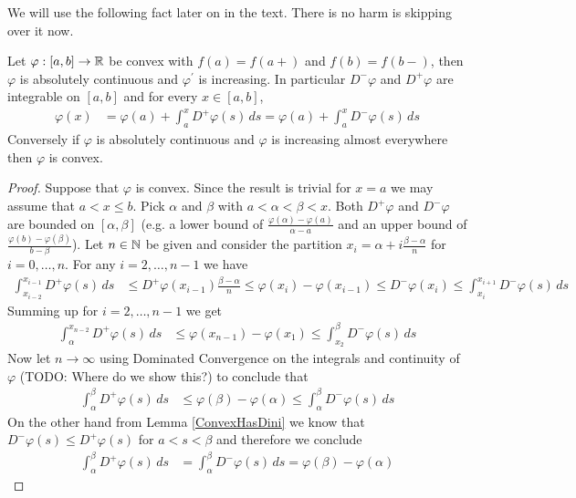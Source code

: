 We will use the following fact later on in the text.  There is no harm
is skipping over it now.
\begin{lem}\label{AbsoluteContinuityOfConvexFunctions}Let $\varphi : [a,b] \to \mathbb{R}$ be convex with $f(a) = f(a+)$ and $f(b) = f(b-)$, then $\varphi$ is absolutely continuous and $\varphi^\prime$ is increasing.  In particular $D^- \varphi$ and $D^+ \varphi$ are integrable on $[a,b]$ and
for every $x \in [a,b]$, 
\begin{align*}
\varphi(x) &= \varphi(a) + \int_a^x D^+\varphi(s) \, ds = \varphi(a) + \int_a^x D^-\varphi(s) \, ds 
\end{align*}
Conversely if $\varphi$ is absolutely continuous and $\varphi$ is increasing almost everywhere then $\varphi$ is convex.
\end{lem}
\begin{proof}
Suppose that $\varphi$ is convex.  Since the result is trivial for $x=a$ we may assume that $a < x \leq b$.  Pick $\alpha$ and $\beta$ with $a < \alpha < \beta < x$.  Both $D^+\varphi$ and $D^- \varphi$ are bounded on $[\alpha, \beta]$ (e.g. a lower bound of $\frac{\varphi(\alpha) - \varphi(a)}{\alpha - a}$ and an upper bound of $\frac{\varphi(b) - \varphi(\beta)}{b - \beta}$).  Let 
$n \in \mathbb{N}$ be given and consider the partition $x_i = \alpha + i \frac{\beta - \alpha}{n}$ for $i=0, \dotsc, n$.  For any $i=2, \dotsc, n-1$ we have
\begin{align*}
\int_{x_{i-2}}^{x_{i-1}} D^+\varphi(s) \, ds  &\leq D^+\varphi (x_{i-1}) \frac{\beta - \alpha}{n} \leq \varphi(x_i) - \varphi(x_{i-1}) \leq D^-\varphi (x_i) \leq \int_{x_{i}}^{x_{i+1}} D^-\varphi(s) \, ds
\end{align*}
Summing up for $i=2, \dotsc, n-1$ we get
\begin{align*}
\int_\alpha^{x_{n-2}} D^+\varphi(s) \, ds &\leq \varphi(x_{n-1}) - \varphi(x_{1}) \leq \int_{x_2}^{\beta} D^-\varphi(s) \, ds
\end{align*}
Now let $n \to \infty$ using Dominated Convergence on the integrals and continuity of $\varphi$ (TODO: Where do we show this?)  to conclude that 
\begin{align*}
\int_\alpha^{\beta} D^+\varphi(s) \, ds &\leq \varphi(\beta) - \varphi(\alpha) \leq \int_{\alpha}^{\beta} D^-\varphi(s) \, ds
\end{align*}
On the other hand from Lemma \ref{ConvexHasDini} we know that $D^- \varphi(s) \leq D^+ \varphi(s)$ for $a <  s < \beta$ and therefore we conclude
\begin{align*}
\int_\alpha^{\beta} D^+\varphi(s) \, ds &= \int_{\alpha}^{\beta} D^-\varphi(s) \, ds = \varphi(\beta) - \varphi(\alpha) 
\end{align*}


\end{proof}
